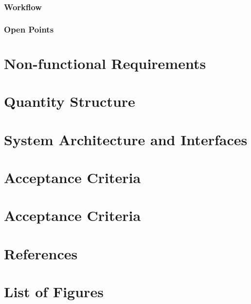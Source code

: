 \documentclass[12pt]{article}
\theoremstyle{definition}
\begin{document}
\subsubsection{Workflow}

\subsubsection{Open Points}

\pagebreak

\section{Non-functional Requirements}

\pagebreak

\section{Quantity Structure}

\pagebreak

\section{System Architecture and Interfaces}

\pagebreak

\section{Acceptance Criteria}

\pagebreak

\section{Acceptance Criteria}

\pagebreak

\section{References}

\pagebreak

\section{List of Figures}

\pagebreak
\end{document}
